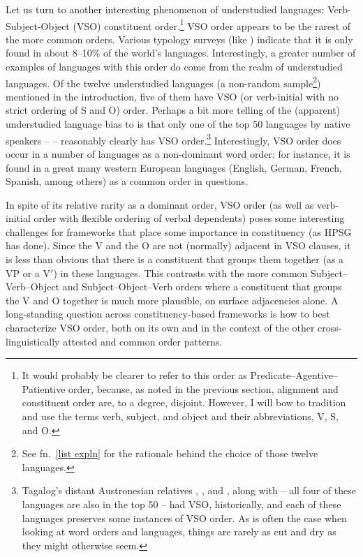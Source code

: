 \documentclass[output=paper
	        ,collection
	        ,collectionchapter
 	        ,biblatex
                ,babelshorthands
                ,newtxmath
                ,draftmode
                ,colorlinks, citecolor=brown
]{langscibook}
\begin{document}
Let us turn to another interesting phenomenon of understudied languages: Verb-Subject-Object (VSO) constituent order.\footnote{It would probably be clearer to refer to this order as Predicate--Agentive--Patientive order, because, as noted in the previous section, alignment and constituent order are, to a degree, disjoint. However, I will bow to tradition and use the terms verb, subject, and object and their abbreviations, V, S, and O.} VSO order appears to be the rarest of the more common orders. Various typology surveys (like \citealt{dryerWALSwordorder}) indicate that it is only found in about 8--10\% of the world's languages. Interestingly, a greater number of examples of languages with this order do come from the realm of understudied languages. Of the twelve understudied languages (a non-random sample\footnote{See fn.\ \ref{list expln} for the rationale behind the choice of those twelve languages.}) mentioned in the introduction, five of them have VSO (or verb-initial with no strict ordering of S and O) order. Perhaps a bit more telling of the (apparent) understudied language bias to  is that only one of the top 50 languages by native speakers --  -- reasonably clearly has VSO order.\footnote{Tagalog's distant Austronesian relatives , , and , along with  -- all four of these languages are also in the top 50 -- had VSO, historically, and each of these languages preserves some instances of VSO order. As is often the case when looking at word orders and languages, things are rarely as cut and dry as they might otherwise seem.} Interestingly, VSO order does occur in a number of languages as a non-dominant word order: for instance, it is found in a great many western European languages (English, German, French, Spanish, among others) as a common order in questions. 

In spite of its relative rarity as a dominant order, VSO order (as well as verb-initial order with flexible ordering of verbal dependents) poses some interesting challenges for frameworks that place some importance in constituency (as HPSG has done). Since the V and the O are not (normally) adjacent in VSO clauses, it is less than obvious that there is a constituent that groups them together (as a VP or a V$'$) in these languages. This contrasts with the more common Subject--Verb--Object and Subject--Object--Verb orders where a constituent that groups the V and O together is much more plausible, on surface adjacencies alone. A long-standing question across constituency-based frameworks is how to best characterize VSO order, both on its own and in the context of the other cross-linguistically attested and common order patterns.  
\end{document}
